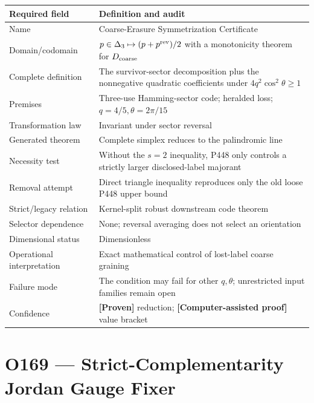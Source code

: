 \documentclass[11pt,a4paper,openany]{report}
\newcommand{\statusProven}{\textcolor{fingreen}{[Proven]}}
\begin{document}
\begin{center}
\begingroup\small
\setlength{\tabcolsep}{2.5pt}
\renewcommand{\arraystretch}{1.16}
\begin{longtable}{@{}p{}p{}@{}}
\toprule
\textbf{Required field} & \textbf{Definition and audit} \\
\midrule
\endhead
Name & Coarse-Erasure Symmetrization Certificate \\
Domain/\allowbreak{}codomain & \(p\in\Delta_3\mapsto (p+p^{\rm rev})/2\) with a monotonicity theorem for \(D_{\rm coarse}\) \\
Complete definition & The survivor-sector decomposition plus the nonnegative quadratic coefficients under \(4q^2\cos^2\theta\ge1\) \\
Premises & Three-use Hamming-sector code; heralded loss; \(q=4/5,\theta=2\pi/15\) \\
Transformation law & Invariant under sector reversal \\
Generated theorem & Complete simplex reduces to the palindromic line \\
Necessity test & Without the \(s=2\) inequality, P448 only controls a strictly larger disclosed-label majorant \\
Removal attempt & Direct triangle inequality reproduces only the old loose P448 upper bound \\
Strict/\allowbreak{}legacy relation & Kernel-split robust downstream code theorem \\
Selector dependence & None; reversal averaging does not select an orientation \\
Dimensional status & Dimensionless \\
Operational interpretation & Exact mathematical control of lost-label coarse graining \\
Failure mode & The condition may fail for other \(q,\theta\); unrestricted input families remain open \\
Confidence & \textbf{\statusProven{}} reduction; \textbf{\textcolor{fingreen}{[Computer-assisted proof]}} value bracket \\
\bottomrule
\end{longtable}
\endgroup
\end{center}

\section{O169 --- Strict-Complementarity Jordan Gauge Fixer}
\end{document}
